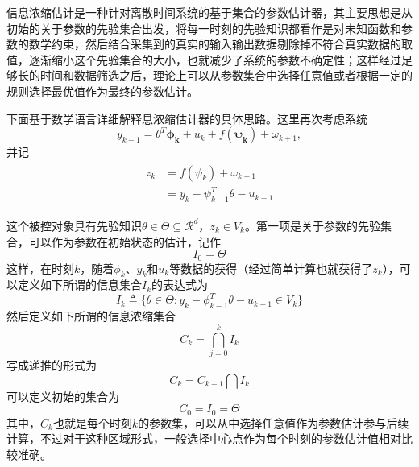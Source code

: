 信息浓缩估计是一种针对离散时间系统的基于集合的参数估计器，其主要思想是从初始的关于参数的先验集合出发，将每一时刻的先验知识都看作是对未知函数和参数的数学约束，然后结合采集到的真实的输入输出数据剔除掉不符合真实数据的取值，逐渐缩小这个先验集合的大小，也就减少了系统的参数不确定性；这样经过足够长的时间和数据筛选之后，理论上可以从参数集合中选择任意值或者根据一定的规则选择最优值作为最终的参数估计。

下面基于数学语言详细解释息浓缩估计器的具体思路。这里再次考虑系统
\begin{equation}%
\label{eq:semi-u2}
y_{k+1} = \theta^{T}\bm{\phi_{k}}+u_{k}+f(\bm{\psi_{k}})+\omega_{k+1},
\end{equation}
并记
\begin{eqnarray}
\label{eq:zk}
\begin{split}%
z_{k} & = f(\psi_{k}) + \omega_{k+1}\\
& = y_{k}-\psi_{k-1}^{T}\theta-u_{k-1}
\end{split}
\end{eqnarray}

这个被控对象具有先验知识$\theta\in\Theta\subseteq\mathcal{R}^{d}$，$z_{k}\in V_{k}$。第一项是关于参数的先验集合，可以作为参数在初始状态的估计，记作
\begin{equation}%
I_{0}=\Theta
\end{equation}
这样，在时刻$k$，随着$\phi_{k}$、$y_{k}$和$u_{k}$等数据的获得（经过简单计算也就获得了$z_{k}$），可以定义如下所谓的信息集合$I_{k}$的表达式为
\begin{equation}
\label{eq.Ik}
I_{k}\triangleq\{\theta\in\Theta\colon y_{k}-\phi_{k-1}^{T}\theta-u_{k-1}\in V_{k}\}
\end{equation}
然后定义如下所谓的信息浓缩集合
\begin{equation}
\label{eq.CkIk}
C_{k} = \bigcap_{j=0}^{k}I_{k}
\end{equation}
写成递推的形式为
\begin{equation}
\label{eq.Ck2}
C_{k} = C_{k-1} \bigcap I_{k}
\end{equation}
可以定义初始的集合为
\begin{equation}
\label{eq.C0}
C_{0}=I_{0}=\Theta
\end{equation}
其中，$C_{k}$也就是每个时刻$k$的参数集，可以从中选择任意值作为参数估计参与后续计算，不过对于这种区域形式，一般选择中心点作为每个时刻的参数估计值相对比较准确。

